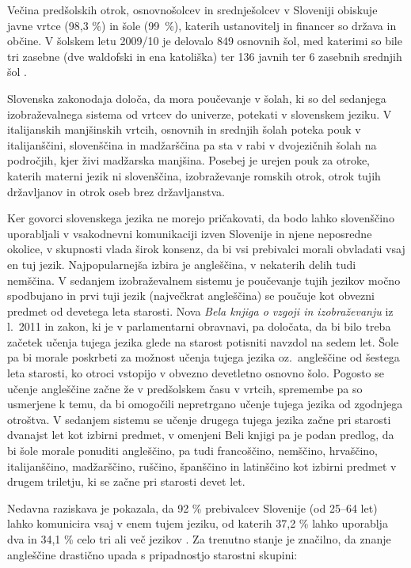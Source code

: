 \begin{multicols}{2}
Večina predšolskih otrok, osnovnošolcev in srednješolcev v Sloveniji obiskuje javne vrtce (98,3 \%) in šole (99~\%), katerih ustanovitelj in financer so država in občine. V šolskem letu 2009/10 je delovalo 849 osnovnih šol, med katerimi so bile tri zasebne (dve wal\-dofski in ena katoliška) ter 136 javnih ter 6 zasebnih srednjih šol \cite{Eurydice1}.

Slovenska zako\-nodaja določa, da mora poučevanje v šolah, ki so del sedanjega izobraževalnega sistema od vrtcev do univerze, potekati v slovenskem jeziku. V itali\-janskih manjšinskih vrtcih, osnovnih in srednjih šolah poteka pouk v itali\-janščini, slovenščina in madžarščina pa sta v rabi v dvojezičnih šolah na področjih, kjer živi madžarska manjšina. Posebej je urejen pouk za otroke, katerih materni jezik ni slovenščina, izobraževanje romskih otrok, otrok tujih držav\-ljanov in otrok oseb brez držav\-ljanstva.

Ker go\-vorci slovenskega jezika ne morejo pričakovati, da bodo lahko slovenščino uporab\-ljali v vsakodnevni komunikaciji izven Slovenije in njene neposredne okolice, v skupnosti vlada širok konsenz, da bi vsi prebivalci morali obvladati vsaj en tuj jezik. Naj\-popular\-nej\-ša izbira je angleščina, v nekaterih delih tudi nemščina. V sedanjem izobraževalnem sistemu je poučevanje tujih jezikov močno spodbujano in prvi tuji jezik (naj\-večkrat angleščina) se poučuje kot obvezni predmet od devetega leta starosti. Nova \textit{Bela knjiga o vzgoji in izobraževanju} iz l.~2011 \cite{BK1} in zakon, ki je v parlamentarni obravnavi, pa določata, da bi bilo treba začetek učenja tujega jezika glede na starost potisniti navzdol na sedem let. Šole pa bi morale poskrbeti za možnost učenja tujega jezika oz.~angleščine od šestega leta starosti, ko otroci vstopijo v obvezno devetletno osnovno šolo. Pogosto se učenje angleščine začne že v predšolskem času v vrtcih, spremembe pa so usmerjene k temu, da bi omogočili nepretrgano učenje tujega jezika od zgodnjega otroštva. V sedanjem sistemu se učenje drugega tujega jezika začne pri starosti dvanaj\-st let kot izbirni predmet, v omenjeni Beli knjigi pa je podan predlog, da bi šole morale ponuditi angleščino, pa tudi francoščino, nemščino, hrvaščino, itali\-janščino, madžarščino, ruščino, španščino in latinščino kot izbirni predmet v drugem triletju, ki se začne pri starosti devet let.


Nedavna raziskava je pokazala, da 92 \% prebivalcev Slovenije (od 25--64 let) lahko komunicira vsaj v enem tujem jeziku, od katerih 37,2 \% lahko uporab\-lja dva in 34,1 \% celo tri ali več jezikov \cite{SURS2}. Za trenutno stanje je značilno, da znanje angleščine drastično upada s pripadnostjo starostni skupini:


\end{multicols}
